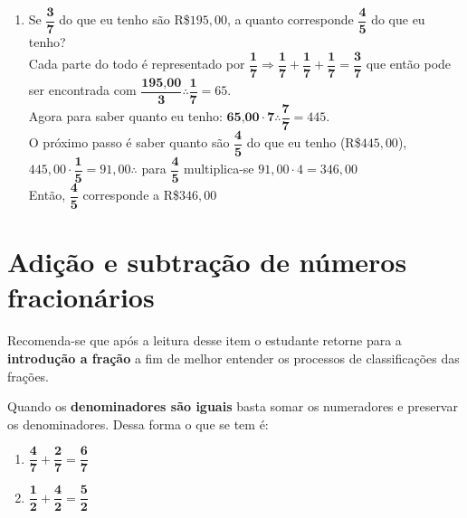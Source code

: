 \begin{enumerate}
	\item Se $\dfrac{\textbf{3}}{\textbf{7}}$ do que eu tenho são R\$$195,00$, a quanto corresponde $\dfrac{\textbf{4}}{\textbf{5}}$ do que eu tenho? \\ Cada parte do todo é representado por $\dfrac{\textbf{1}}{\textbf{7}} \Rightarrow \dfrac{\textbf{1}}{\textbf{7}} + \dfrac{\textbf{1}}{\textbf{7}} + \dfrac{\textbf{1}}{\textbf{7}} = \dfrac{\textbf{3}}{\textbf{7}}$ que então pode ser encontrada com $\dfrac{\textbf{195,00}}{\textbf{3}} \therefore \dfrac{\textbf{1}}{\textbf{7}} = 65$. \\
	Agora para saber quanto eu tenho: $\textbf{65,00}\cdot\textbf{7} \therefore \dfrac{\textbf{7}}{\textbf{7}} = 445$. \\
	O próximo passo é saber quanto são $\dfrac{\textbf{4}}{\textbf{5}}$ do que eu tenho (R\$$445,00$), \\
	$445,00\cdot\dfrac{\textbf{1}}{\textbf{5}} = 91,00 \therefore $ para $\dfrac{\textbf{4}}{\textbf{5}}$ multiplica-se $91,00\cdot4 = 346,00$ \\
	Então, $\dfrac{\textbf{4}}{\textbf{5}}$ corresponde a R\$$346,00$
	
\end{enumerate}

	\section{Adição e subtração de números fracionários}
	
	Recomenda-se que após a leitura desse item o estudante retorne para a \textbf{introdução a fração} a fim de melhor entender os processos de classificações das frações.
	
	Quando os \textbf{denominadores são iguais} basta somar os numeradores e preservar os denominadores.
	Dessa forma o que se tem é:
		\begin{enumerate}[label=\alph*)]
			\item $\dfrac{\textbf{4}}{\textbf{7}} + \dfrac{\textbf{2}}{\textbf{7}} = \dfrac{\textbf{6}}{\textbf{7}}$
			\item $\dfrac{\textbf{1}}{\textbf{2}} + \dfrac{\textbf{4}}{\textbf{2}} = \dfrac{\textbf{5}}{\textbf{2}}$
		\end{enumerate}
	
